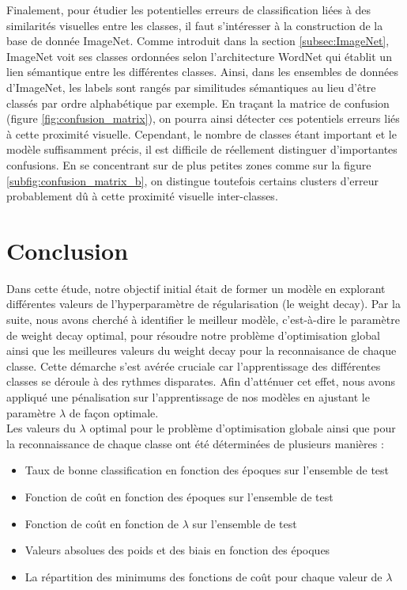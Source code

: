\documentclass[12pt,english, openany]{book}
\begin{document}
Finalement, pour étudier les potentielles erreurs de classification liées à des similarités visuelles entre les classes, il faut s'intéresser à la construction de la base de donnée ImageNet. Comme introduit dans la section \ref{subsec:ImageNet}, ImageNet voit ses classes ordonnées selon l'architecture WordNet qui établit un lien sémantique entre les différentes classes. Ainsi, dans les ensembles de données d'ImageNet, les labels sont rangés par similitudes sémantiques au lieu d'être classés par ordre alphabétique par exemple. En traçant la matrice de confusion (figure \ref{fig:confusion_matrix}), on pourra ainsi détecter ces potentiels erreurs liés à cette proximité visuelle. Cependant, le nombre de classes étant important et le modèle suffisamment précis, il est difficile de réellement distinguer d'importantes confusions. En se concentrant sur de plus petites zones comme sur la figure \ref{subfig:confusion_matrix_b}, on distingue toutefois certains clusters d'erreur probablement dû à cette proximité visuelle inter-classes.

\chapter{Conclusion}
Dans cette étude, notre objectif initial était de former un modèle en explorant différentes valeurs de l'hyperparamètre de régularisation (le weight decay). Par la suite, nous avons cherché à identifier le meilleur modèle, c'est-à-dire le paramètre de weight decay optimal, pour résoudre notre problème d'optimisation global ainsi que les meilleures valeurs du weight decay pour la reconnaisance de chaque classe. Cette démarche s'est avérée cruciale car l'apprentissage des différentes classes se déroule à des rythmes disparates. Afin d'atténuer cet effet, nous avons appliqué une pénalisation sur l'apprentissage de nos modèles en ajustant le paramètre $\lambda$ de façon optimale.\\

Les valeurs du $\lambda$ optimal pour le problème d'optimisation globale ainsi que pour la reconnaissance de chaque classe ont été déterminées de plusieurs manières :\\

\begin{itemize}
    \item Taux de bonne classification en fonction des époques sur l'ensemble de test
    \item Fonction de coût en fonction des époques sur l'ensemble de test
    \item Fonction de coût en fonction de $\lambda$ sur l'ensemble de test
    \item Valeurs absolues des poids et des biais en fonction des époques
    \item La répartition des minimums des fonctions de coût pour chaque valeur de $\lambda$\\
\end{itemize}
\end{document}

